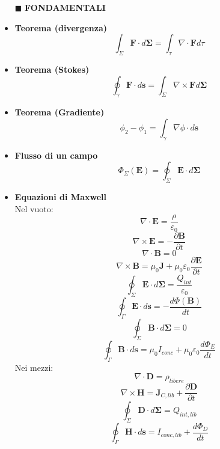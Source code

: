 \documentclass{book}
\newcommand{\g}{\textbf}
\newcommand{\h}{\mathbf}
\newcommand{\e}{\begin{equation}}
\newcommand{\ex}{\end{equation} }
\renewcommand{\it}{\item[$\cdot$]}
\begin{document}
\begin{multicols*}{4}
\begin{itemize}

\item [$\blacksquare$] \g{FONDAMENTALI}
    \it \g{Teorema (divergenza)}
        \e{\int_\Sigma \h{F} \cdot d \h{\Sigma}= \int_\tau \nabla \cdot \h{F} d\tau} \ex
    \it \g{Teorema (Stokes)}
        \e{\oint_\gamma\h{F}\cdot d\h{s}=\int_\Sigma \nabla \times \h{F} d\h{\Sigma}} \ex
    \it \g{Teorema (Gradiente)}
        \e{\phi_2-\phi_1=\int_\gamma\nabla\phi\cdot d\h{s} }\ex
    \it \g{Flusso di un campo}
        \e{ \Phi_\Sigma(\h{E})=\oint_\Sigma \h{E}\cdot d\h{\Sigma}   
        } \ex
    \it \g{Equazioni di Maxwell} \\
        Nel vuoto:
        \e{\nabla\cdot\h{E}=\frac{\rho}{\varepsilon_0}}\ex
        \e{\nabla\times\h{E}=-\frac{\partial \h{B}}{\partial t}} \ex
        \e{\nabla\cdot\h{B}}=0\ex
        \e{\nabla\times\h{B}=\mu_0\h{J}+\mu_0\varepsilon_0\frac{\partial \h{E}}{\partial t}} \ex
        \e{\oint_\Sigma\h{E}\cdot d\h{\Sigma}=\frac{Q_{int}}{\varepsilon_0}} \ex
        \e{\oint_\Gamma\h{E}\cdot d\h{s}=-\frac{d \Phi(\h{B})}{dt}} \ex
        \e{\oint_\Sigma\h{B}\cdot d\h{\Sigma}=0} \ex
        \e{\oint_\Gamma\h{B}\cdot d\h{s}=\mu_0 I_{conc} +\mu_0\varepsilon_0\frac{d \Phi_E}{d t}} \ex
        Nei mezzi:
        \e{\nabla\cdot\h{D}=\rho_{libere}}\ex
        \e{\nabla\times\h{H}=\h{J}_{C,lib}+\frac{\partial\h{D}}{\partial t}} \ex
        \e{\oint_\Sigma\h{D}\cdot d\h{\Sigma}=Q_{int,lib}} \ex
        \e{\oint_\Gamma\h{H}\cdot d\h{s}=I_{conc,lib} + \frac{d \Phi_D}{d t}} \ex


\end{itemize}
\end{multicols*}
\end{document}
